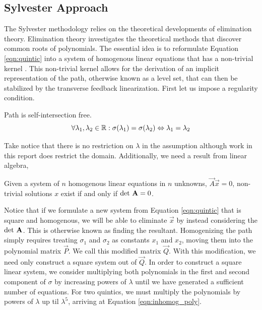\documentclass[oneside, 11pt]{book}
\begin{document}
\subsection{Sylvester Approach}
The Sylvester methodology relies on the theoretical developments of elimination theory. Elimination theory investigates the theoretical methods that discover common roots of polynomials. The essential idea is to reformulate Equation \ref{eqn:quintic} into a system of homogenous linear equations that has a non-trivial kernel \cite{Sederberg84}. This non-trivial kernel allows for the derivation of an implicit representation of the path, otherwise known as a level set, that can then be stabilized by the transverse feedback linearization. First let us impose a regularity condition.

\begin{assumption}
    Path is self-intersection free.
    \begin{equation*}
        \forall \lambda_1, \lambda_2 \in\mathbb{R} : \sigma(\lambda_1) = \sigma(\lambda_2) \Leftrightarrow \lambda_1 = \lambda_2
    \end{equation*}
    \label{ass:self_intersect}
\end{assumption}

Take notice that there is no restriction on $\lambda$ in the assumption although work in this report does restrict the domain. Additionally, we need a result from linear algebra,

\begin{theorem}
    Given a system of $n$ homogenous linear equations in $n$ unknowns, $\vec{A}\vec{x}=0$, non-trivial solutions $x$ exist if and only if $\text{det}~\mathbf{A}=0$. \label{thm:kernel}
\end{theorem}

Notice that if we formulate a new system from Equation \ref{eqn:quintic} that is square and homogenous, we will be able to eliminate $\vec{x}$ by instead considering the $\text{det}~\mathbf{A}$. This is otherwise known as finding the resultant. Homogenizing the path simply requires treating $\sigma_1$ and $\sigma_2$ as constants $x_1$ and $x_2$, moving them into the polynomial matrix $\vec{P}$. We call this modified matrix $\vec{Q}$. With this modification, we need only construct a square system out of $\vec{Q}$. In order to construct a square linear system, we consider multiplying both polynomials in the first and second component of $\sigma$ by increasing powers of $\lambda$ until we have generated a sufficient number of equations. For two quintics, we must multiply the polynomials by powers of $\lambda$ up til $\lambda^5$, arriving at Equation \ref{eqn:inhomog_poly}.
\end{document}
